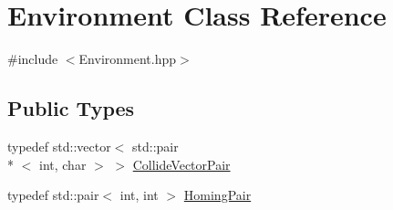 \hypertarget{classEnvironment}{\section{Environment Class Reference}
\label{classEnvironment}
}


{\ttfamily \#include $<$Environment.\-hpp$>$}

\subsection*{Public Types}
\begin{DoxyCompactItemize}
\item 
typedef std\-::vector$<$ std\-::pair\\*
$<$ int, char $>$ $>$ \hyperlink{classEnvironment_a9609fedf5c7244c3515c8e5640b81e85}{Collide\-Vector\-Pair}
\item 
typedef std\-::pair$<$ int, int $>$ \hyperlink{classEnvironment_aa0cae1577b893c94479b544518c11d3b}{Homing\-Pair}
\end{DoxyCompactItemize}
